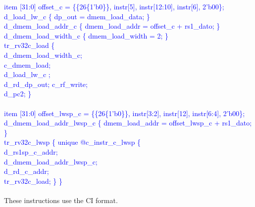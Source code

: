 \textcolor{blue}{
\indent item [31:0] offset\_c = \{\{26\{1'b0\}\}, instr[5], instr[12:10], instr[6], 2'b00\};\\%
\indent d\_load\_lw\_c \{ dp\_out = dmem\_load\_data; \}\\%
\indent d\_dmem\_load\_addr\_c \{ dmem\_load\_addr = offset\_c + rs1\_dato; \}\\%
\indent d\_dmem\_load\_width\_c \{ dmem\_load\_width = 2; \}\\%
\indent tr\_rv32c\_load \{\\%
\indent \hspace{\parindent}d\_dmem\_load\_width\_c; \\%
\indent \hspace{\parindent}c\_dmem\_load; \\%
\indent \hspace{\parindent}d\_load\_lw\_c ; \\%
\indent \hspace{\parindent}d\_rd\_dp\_out; c\_rf\_write; \\%
\indent \hspace{\parindent}d\_pc2; \} \\%
	\\
\indent item [31:0] offset\_lwsp\_c = \{\{26\{1'b0\}\}, instr[3:2], instr[12], instr[6:4], 2'b00\};\\%
\indent d\_dmem\_load\_addr\_lwsp\_c \{ dmem\_load\_addr = offset\_lwsp\_c + rs1\_dato; \}\\%
\indent tr\_rv32c\_lwsp \{ unique @c\_instr\_c\_lwsp \{\\%
\indent \hspace{\parindent} d\_rs1sp\_c\_addr; \\%
\indent \hspace{\parindent} d\_dmem\_load\_addr\_lwsp\_c; \\%
\indent \hspace{\parindent} d\_rd\_c\_addr; \\%
\indent \hspace{\parindent} tr\_rv32c\_load; \} \} \\%
\\
}
These instructions use the CI format.

